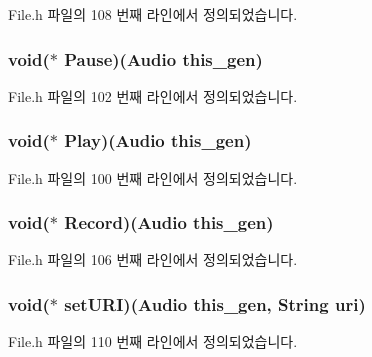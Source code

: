 File.\-h 파일의 108 번째 라인에서 정의되었습니다.

\hypertarget{struct___audio_a3d78751cda929e033894cbd9f552ae8e}{
\subsubsection[{Pause}]{\setlength{\rightskip}{0pt plus 5cm}void($\ast$  Pause)({\bf Audio} this\-\_\-gen)}}\label{struct___audio_a3d78751cda929e033894cbd9f552ae8e}


File.\-h 파일의 102 번째 라인에서 정의되었습니다.

\hypertarget{struct___audio_a406855bb5ad50dfefae012be99b06cde}{
\subsubsection[{Play}]{\setlength{\rightskip}{0pt plus 5cm}void($\ast$  Play)({\bf Audio} this\-\_\-gen)}}\label{struct___audio_a406855bb5ad50dfefae012be99b06cde}


File.\-h 파일의 100 번째 라인에서 정의되었습니다.

\hypertarget{struct___audio_abcf52f46187e6c2e2fbc5bd8512adad1}{
\subsubsection[{Record}]{\setlength{\rightskip}{0pt plus 5cm}void($\ast$  Record)({\bf Audio} this\-\_\-gen)}}\label{struct___audio_abcf52f46187e6c2e2fbc5bd8512adad1}


File.\-h 파일의 106 번째 라인에서 정의되었습니다.

\hypertarget{struct___audio_a1c40fa54cdb34775aeb35430f5901990}{
\subsubsection[{set\-U\-R\-I}]{\setlength{\rightskip}{0pt plus 5cm}void($\ast$  set\-U\-R\-I)({\bf Audio} this\-\_\-gen, {\bf String} uri)}}\label{struct___audio_a1c40fa54cdb34775aeb35430f5901990}


File.\-h 파일의 110 번째 라인에서 정의되었습니다.

